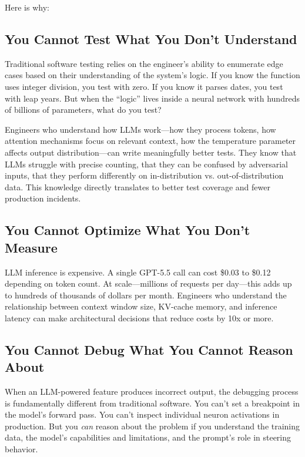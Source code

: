 Here is why:

\subsection{You Cannot Test What You Don't Understand}

Traditional software testing relies on the engineer's ability to enumerate edge cases based on their understanding of the system's logic. If you know the function uses integer division, you test with zero. If you know it parses dates, you test with leap years. But when the ``logic'' lives inside a neural network with hundreds of billions of parameters, what do you test?

Engineers who understand how LLMs work---how they process tokens, how attention mechanisms focus on relevant context, how the temperature parameter affects output distribution---can write meaningfully better tests. They know that LLMs struggle with precise counting, that they can be confused by adversarial inputs, that they perform differently on in-distribution vs. out-of-distribution data. This knowledge directly translates to better test coverage and fewer production incidents.

\subsection{You Cannot Optimize What You Don't Measure}

LLM inference is expensive. A single GPT-5.5 call can cost \$0.03 to \$0.12 depending on token count. At scale---millions of requests per day---this adds up to hundreds of thousands of dollars per month. Engineers who understand the relationship between context window size, KV-cache memory, and inference latency can make architectural decisions that reduce costs by 10x or more.

\subsection{You Cannot Debug What You Cannot Reason About}

When an LLM-powered feature produces incorrect output, the debugging process is fundamentally different from traditional software. You can't set a breakpoint in the model's forward pass. You can't inspect individual neuron activations in production. But you \emph{can} reason about the problem if you understand the training data, the model's capabilities and limitations, and the prompt's role in steering behavior.

